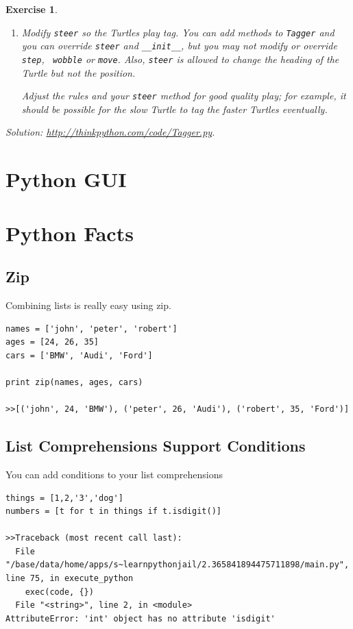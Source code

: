 \documentclass[12pt,a4paper,final,twoside,onecolumn,titlepage]{book}
\newtheorem{exercise}{Exercise}[chapter]
\begin{document}
\begin{exercise}
\begin{enumerate}
\item Modify {\tt steer} so the Turtles play tag.  You can add methods
  to {\tt Tagger} and you can override {\tt steer} and
  \verb"__init__", but you may not modify or override {\tt step}, {\tt
    wobble} or {\tt move}.  Also, {\tt steer} is allowed to change the
  heading of the Turtle but not the position.

Adjust the rules and your {\tt steer} method for good quality play;
for example, it should be possible for the slow Turtle to tag the
faster Turtles eventually.

\end{enumerate}

Solution: \url{http://thinkpython.com/code/Tagger.py}.
\end{exercise}


%

\chapter{Python GUI}



%

\chapter{Python Facts}
\section{Zip}
Combining lists is really easy using zip.
\begin{lstlisting}
names = ['john', 'peter', 'robert']
ages = [24, 26, 35]
cars = ['BMW', 'Audi', 'Ford']

print zip(names, ages, cars)

>>[('john', 24, 'BMW'), ('peter', 26, 'Audi'), ('robert', 35, 'Ford')]
\end{lstlisting}

\section{List Comprehensions Support Conditions}
You can add conditions to your list comprehensions
\begin{lstlisting}
things = [1,2,'3','dog']
numbers = [t for t in things if t.isdigit()]

>>Traceback (most recent call last):
  File "/base/data/home/apps/s~learnpythonjail/2.365841894475711898/main.py", line 75, in execute_python
    exec(code, {})
  File "<string>", line 2, in <module>
AttributeError: 'int' object has no attribute 'isdigit'
\end{lstlisting}
\end{document}
